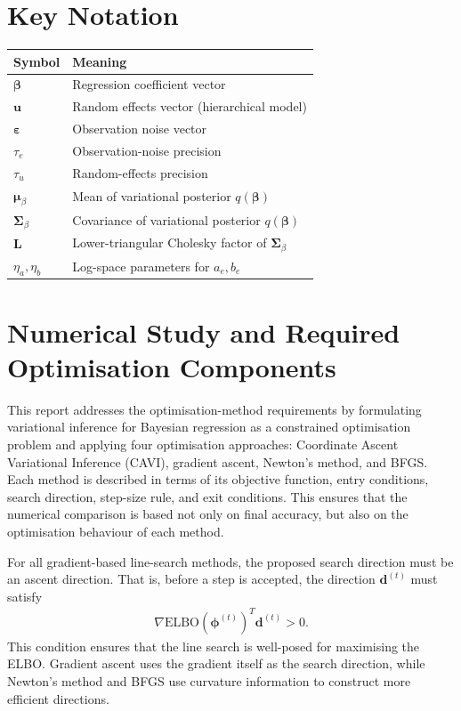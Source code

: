 \documentclass[11pt,a4paper]{article}
\newcommand{\ELBO}{\text{ELBO}}
\begin{document}
\section*{Key Notation}

\begin{center}
\begin{tabular}{ll}
\hline
Symbol & Meaning \\
\hline
$\bm{\beta}$ & Regression coefficient vector \\
$\bm{u}$ & Random effects vector (hierarchical model) \\
$\bm{\varepsilon}$ & Observation noise vector \\
$\tau_e$ & Observation-noise precision \\
$\tau_u$ & Random-effects precision \\
$\bm{\mu}_\beta$ & Mean of variational posterior $q(\bm{\beta})$ \\
$\bm{\Sigma}_\beta$ & Covariance of variational posterior $q(\bm{\beta})$ \\
$\bm{L}$ & Lower-triangular Cholesky factor of $\bm{\Sigma}_\beta$ \\
$\eta_a, \eta_b$ & Log-space parameters for $a_e, b_e$ \\
\hline
\end{tabular}
\end{center}
\newpage
\section*{Numerical Study and Required Optimisation Components}

This report addresses the optimisation-method requirements by formulating variational inference for Bayesian regression as a constrained optimisation problem and applying four optimisation approaches: Coordinate Ascent Variational Inference (CAVI), gradient ascent, Newton's method, and BFGS. Each method is described in terms of its objective function, entry conditions, search direction, step-size rule, and exit conditions. This ensures that the numerical comparison is based not only on final accuracy, but also on the optimisation behaviour of each method.

For all gradient-based line-search methods, the proposed search direction must be an ascent direction. That is, before a step is accepted, the direction $\bm{d}^{(t)}$ must satisfy
\begin{align}
\nabla \ELBO(\bm{\phi}^{(t)})^T \bm{d}^{(t)} > 0.
\end{align}
This condition ensures that the line search is well-posed for maximising the ELBO. Gradient ascent uses the gradient itself as the search direction, while Newton's method and BFGS use curvature information to construct more efficient directions.
\end{document}
